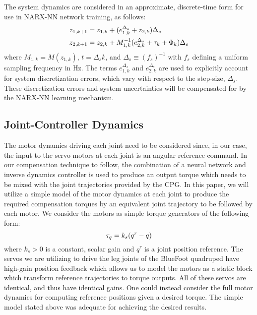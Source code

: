 The system dynamics are considered in an approximate, discrete-time form for use in NARX-NN network training, as follows:
	\begin{equation}
		\vspace{-1.0mm}
		\begin{split}
		{z}_{1,k+1} &= {z}_{1,k} + ( {e}_{1,k}^{\Delta_{s}} + {z}_{2,k} )\Delta_{s} \\
		{z}_{2,k+1} &= {z}_{2,k} + M^{-1}_{1,k}( {e}_{2,k}^{\Delta_{s}} + \tau_{k} + \Phi_{k}) \Delta_{s} \\
		\end{split}
		\label{eq::sampled_dynamics}
	\end{equation}
where $M_{1,k} = M(z_{1,k})$, $t = \Delta_{s} k$, and $\Delta_{s} \equiv (f_{s})^{-1}$ with $f_{s}$ defining a uniform sampling frequency in Hz. The terms ${e}_{1,k}^{\Delta_{s}}$ and ${e}_{2,k}^{\Delta_{s}}$ are used to explicitly account for system discretization errors, which vary with respect to the step-size, $\Delta_{s}$. These discretization errors and system uncertainties will be compensated for by the NARX-NN learning mechanism.


\subsection{Joint-Controller Dynamics}
%
%
The motor dynamics driving each joint need to be considered since, in our case, the input to the servo motors at each joint is an angular reference command. In our compensation technique to follow, the combination of a neural network and inverse dynamics controller is used to produce an output torque which needs to be mixed  with the joint trajectories provided by the CPG. In this paper, we will utilize a simple model of the motor dynamics at each joint to produce the required compensation torques by an equivalent joint trajectory to be followed by each motor. We consider the motors as simple torque generators of the following form:
	\begin{equation}
		\vspace{-1mm}
		\tau_{q} = k_{s}(q^{r}-q)
		\label{eq::servo_control_dynamics}
	\end{equation}
where $k_{s}>0$ is a constant, scalar gain and $q^{r}$ is a joint position reference. The servos we are utilizing to drive the leg joints of the BlueFoot quadruped have high-gain position feedback which allows us to model the motors as a static block which transform reference trajectories to torque outputs. All of these servos are identical, and thus have identical gains. One could instead consider the full motor dynamics for computing reference positions given a desired torque. The simple model stated above was adequate for achieving the desired results.